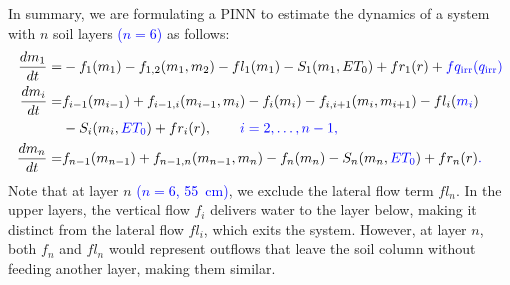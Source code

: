 \documentclass[pdflatex,sn-nature]{sn-jnl}%
\theoremstyle{thmstyleone}%
\theoremstyle{thmstyletwo}%
\theoremstyle{thmstylethree}%
\begin{document}
In summary, we are formulating a PINN to estimate the dynamics of a system with $n$ soil layers \textcolor{blue}{($n=6$)} as follows:
\begin{equation}
\label{system}
\begin{aligned}
\frac{d{m}_1}{dt} = & - f_1({m}_1) - f_{1,2}({m}_1,{m}_2) - fl_1(m_1) - S_1({m}_1, ET_0) + fr_1(r) + \textcolor{blue}{fq_{\mathrm{irr}}(q_{\mathrm{irr}})}\\
\frac{d{m}_i}{dt} = & f_{i-1}({m}_{i-1}) + f_{i-1,i}({m}_{i-1},{m}_i) - f_i({m}_i)- f_{i,i+1}({m}_i,{m}_{i+1}) - fl_i(\textcolor{blue}{m_i}) \\ 
 & - S_i({m}_i, \textcolor{blue}{ET_0}) + fr_i(r), \qquad \textcolor{blue}{i = 2,\dots,n-1,}\\
\frac{d{m}_n}{dt} = & f_{n-1}({m}_{n-1}) + f_{n-1,n}({m}_{n-1},{m}_n) - f_n({m}_n) - S_n({m}_n, \textcolor{blue}{ET_0}) + fr_n(r)\textcolor{blue}{.}
\end{aligned}
\end{equation}
Note that at layer $n$ \textcolor{blue}{($n=6$, \SI{55}{cm})}, we exclude the lateral flow term $fl_n$. In the upper layers, the vertical flow $f_i$ delivers water to the layer below, making it distinct from the lateral flow $fl_i$, which exits the system. However, at layer $n$, both $f_n$ and $fl_n$ would represent outflows that leave the soil column without feeding another layer, making them similar.
\end{document}
